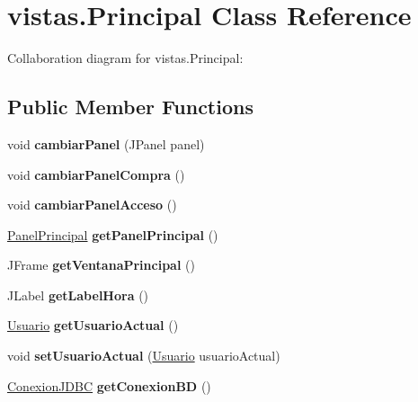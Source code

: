\hypertarget{classvistas_1_1_principal}{}\section{vistas.\+Principal Class Reference}
\label{classvistas_1_1_principal}


Collaboration diagram for vistas.\+Principal\+:
\subsection*{Public Member Functions}
\begin{DoxyCompactItemize}
\item 
\mbox{\label{classvistas_1_1_principal_a0f01204c3cdf3b88718a5f2c6a6d9ac9}} 
void {\bfseries cambiar\+Panel} (J\+Panel panel)
\item 
\mbox{\label{classvistas_1_1_principal_aa6783bab03cc60f1bf401d4c16293318}} 
void {\bfseries cambiar\+Panel\+Compra} ()
\item 
\mbox{\label{classvistas_1_1_principal_a0823d729a42c384bf4afd30b60a3e468}} 
void {\bfseries cambiar\+Panel\+Acceso} ()
\item 
\mbox{\label{classvistas_1_1_principal_a546a7dca6785535d3f48f5a7b43c20a1}} 
\mbox{\hyperlink{classpaneles_1_1_panel_principal}{Panel\+Principal}} {\bfseries get\+Panel\+Principal} ()
\item 
\mbox{\label{classvistas_1_1_principal_afc2c81827c88c9c2494b3345264e747d}} 
J\+Frame {\bfseries get\+Ventana\+Principal} ()
\item 
\mbox{\label{classvistas_1_1_principal_a95e7bccba557226e9e56211a58a2e03c}} 
J\+Label {\bfseries get\+Label\+Hora} ()
\item 
\mbox{\label{classvistas_1_1_principal_af7ea8d6ba599873466968add34233be0}} 
\mbox{\hyperlink{classobjetos_1_1_usuario}{Usuario}} {\bfseries get\+Usuario\+Actual} ()
\item 
\mbox{\label{classvistas_1_1_principal_a6f45e56ee7c99715b798ff202bd57d7e}} 
void {\bfseries set\+Usuario\+Actual} (\mbox{\hyperlink{classobjetos_1_1_usuario}{Usuario}} usuario\+Actual)
\item 
\mbox{\label{classvistas_1_1_principal_ad7379276c979124d4386d01439f24b42}} 
\mbox{\hyperlink{classmysql_1_1_conexion_j_d_b_c}{Conexion\+J\+D\+BC}} {\bfseries get\+Conexion\+BD} ()
\end{DoxyCompactItemize}
